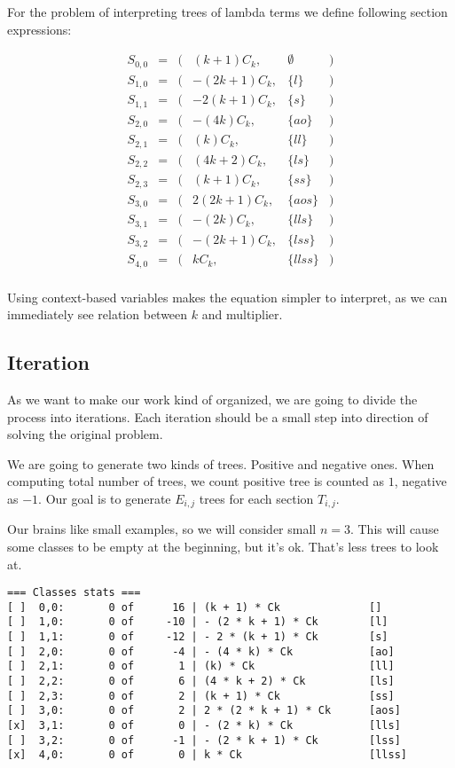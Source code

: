 \documentclass[final]{article}
\theoremstyle{definition}
\theoremstyle{remark}
\begin{document}
For the problem of interpreting trees of lambda terms we define following section expressions:

\[\begin{array}{rccrlc}
        S_{0,0} &=& (& (k + 1) C_k,& \emptyset &)\\
        S_{1,0} &=& (& - (2 k + 1) C_k,& \{l\} &)\\
        S_{1,1} &=& (& - 2 (k + 1) C_k,& \{s\} &)\\
        S_{2,0} &=& (& - (4 k) C_k,& \{ao\} &)\\
        S_{2,1} &=& (& (k) C_k,& \{ll\} &)\\
        S_{2,2} &=& (& (4 k + 2) C_k,& \{ls\} &)\\
        S_{2,3} &=& (& (k + 1) C_k,& \{ss\} &)\\
        S_{3,0} &=& (& 2 (2 k + 1) C_k,& \{aos\} &)\\
        S_{3,1} &=& (& - (2 k) C_k,& \{lls\} &)\\
        S_{3,2} &=& (& - (2 k + 1) C_k,& \{lss\} &)\\
        S_{4,0} &=& (& k C_k,& \{llss\} &)\\
\end{array}\]

Using context-based variables makes the equation simpler to interpret, as we can immediately see relation between \(k\) and multiplier.

\subsection{Iteration}%
\label{sub:iteration}

As we want to make our work kind of organized, we are going to divide the process into iterations. Each iteration should be a small step into direction of solving the original problem.

We are going to generate two kinds of trees. Positive and negative ones. When computing total number of trees, we count positive tree is counted as \(1\), negative as \(-1\). Our goal is to generate \(E_{i, j}\) trees for each section \(T_{i, j}\).

Our brains like small examples, so we will consider small \(n = 3\). This will cause some classes to be empty at the beginning, but it's ok. That's less trees to look at.


\begin{lstlisting}
=== Classes stats ===
[ ]  0,0:       0 of      16 | (k + 1) * Ck              []
[ ]  1,0:       0 of     -10 | - (2 * k + 1) * Ck        [l]
[ ]  1,1:       0 of     -12 | - 2 * (k + 1) * Ck        [s]
[ ]  2,0:       0 of      -4 | - (4 * k) * Ck            [ao]
[ ]  2,1:       0 of       1 | (k) * Ck                  [ll]
[ ]  2,2:       0 of       6 | (4 * k + 2) * Ck          [ls]
[ ]  2,3:       0 of       2 | (k + 1) * Ck              [ss]
[ ]  3,0:       0 of       2 | 2 * (2 * k + 1) * Ck      [aos]
[x]  3,1:       0 of       0 | - (2 * k) * Ck            [lls]
[ ]  3,2:       0 of      -1 | - (2 * k + 1) * Ck        [lss]
[x]  4,0:       0 of       0 | k * Ck                    [llss]
\end{lstlisting}
\end{document}
